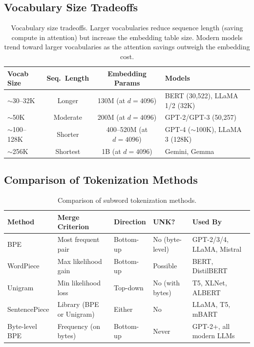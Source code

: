 \subsection{Vocabulary Size Tradeoffs}

\begin{table}[H]
\centering
\small
\begin{tabularx}{\textwidth}{@{}l c c X@{}}
\toprule
\textbf{Vocab Size} & \textbf{Seq.\ Length} & \textbf{Embedding Params} & \textbf{Models} \\
\midrule
$\sim$30--32K & Longer   & 130M (at $d{=}4096$) & BERT (30,522), LLaMA 1/2 (32K) \\
$\sim$50K  & Moderate & 200M (at $d{=}4096$) & GPT-2/GPT-3 (50,257) \\
$\sim$100--128K & Shorter  & 400--520M (at $d{=}4096$) & GPT-4 ($\sim$100K), LLaMA 3 (128K) \\
$\sim$256K & Shortest & 1B (at $d{=}4096$) & Gemini, Gemma \\
\bottomrule
\end{tabularx}
\caption{Vocabulary size tradeoffs.  Larger vocabularies reduce sequence length (saving
compute in attention) but increase the embedding table size.  Modern models trend toward
larger vocabularies as the attention savings outweigh the embedding cost.}
\label{tab:vocab_size}
\end{table}

\subsection{Comparison of Tokenization Methods}

\begin{table}[H]
\centering
\small
\begin{tabularx}{\textwidth}{@{}l l l l X@{}}
\toprule
\textbf{Method} & \textbf{Merge Criterion} & \textbf{Direction} & \textbf{UNK?} & \textbf{Used By} \\
\midrule
BPE              & Most frequent pair        & Bottom-up & No (byte-level)  & GPT-2/3/4, LLaMA, Mistral \\
WordPiece        & Max likelihood gain       & Bottom-up & Possible         & BERT, DistilBERT \\
Unigram          & Min likelihood loss        & Top-down  & No (with bytes)  & T5, XLNet, ALBERT \\
SentencePiece    & Library (BPE or Unigram)  & Either    & No               & LLaMA, T5, mBART \\
Byte-level BPE   & Frequency (on bytes)       & Bottom-up & Never            & GPT-2+, all modern LLMs \\
\bottomrule
\end{tabularx}
\caption{Comparison of subword tokenization methods.}
\label{tab:tokenizer_comparison}
\end{table}

